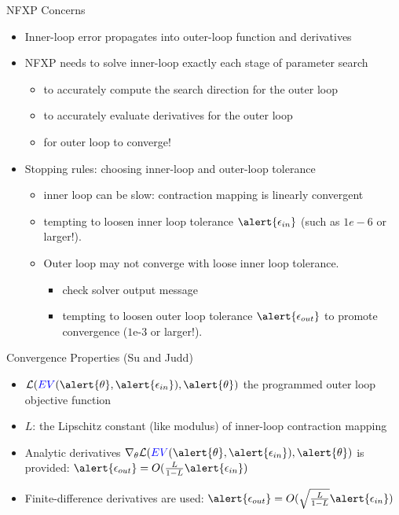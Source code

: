 \documentclass[xcolor=pdftex,dvipsnames,table,mathserif,aspectratio=169]{beamer}
\begin{document}
\begin{frame}{NFXP Concerns}
\begin{itemize}
\item Inner-loop error propagates into outer-loop function and derivatives
\item NFXP needs to solve inner-loop exactly each stage of parameter search
\begin{itemize}
\item to accurately compute the search direction for the outer loop
\item to accurately evaluate derivatives for the outer loop
\item for outer loop to converge!
\end{itemize}
\item Stopping rules: choosing inner-loop and outer-loop tolerance
\begin{itemize}
\item inner loop can be slow: contraction mapping is linearly convergent
\item tempting to loosen inner loop tolerance $\alert{\epsilon_{in}}$ (such as $1e-6$ or larger!).
\item Outer loop may not converge with loose inner loop tolerance.
\begin{itemize}
\item check solver output message
\item tempting to loosen outer loop tolerance $\alert{\epsilon_{out}}$ to promote convergence ($1\text{e-}3$ or larger!).
\end{itemize}
\end{itemize}
\end{itemize}
\end{frame}

\begin{frame}{Convergence Properties (Su and Judd)}
\begin{itemize}
\item $\mathcal{L}(\textcolor{blue}{EV}(\alert{\theta},\alert{\epsilon_{in}} ), \alert{\theta} )$ the programmed outer loop objective function
\item $L$: the Lipschitz constant (like modulus) of inner-loop contraction mapping
\item Analytic derivatives $\nabla_{\theta} \mathcal{L}(\textcolor{blue}{EV}(\alert{\theta},\alert{\epsilon_{in}} ), \alert{\theta} )$ is provided: $\alert{\epsilon_{out}} = O(\frac{L}{1-L} \alert{\epsilon_{in}})$
\item Finite-difference derivatives are used: $\alert{\epsilon_{out}} = O ( \sqrt{\frac{L}{1-L}} \alert{\epsilon_{in}} )$ 
\end{itemize}
\end{frame}
\end{document}
